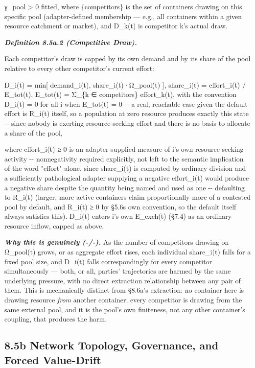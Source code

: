\documentclass[
]{article}
\begin{document}
γ\_pool \textgreater{} 0 fitted, where \{competitors\} is the set of
containers drawing on this specific pool (adapter-defined membership ---
e.g., all containers within a given resource catchment or market), and
D\_k(t) is competitor k's actual draw.

\emph{\textbf{Definition 8.5a.2 (Competitive Draw).}}

Each competitor's draw is capped by its own demand and by its share of
the pool relative to every other competitor's current effort:

D\_i(t) = min{[} demand\_i(t), share\_i(t)·Ω\_pool(t) {]}, share\_i(t) =
effort\_i(t) / E\_tot(t), E\_tot(t) = Σ\_\{k ∈ competitors\}
effort\_k(t), with the convention D\_i(t) = 0 for all i when E\_tot(t) =
0 -\/- a real, reachable case given the default effort is R\_i(t)
itself, so a population at zero resource produces exactly this state
-\/- since nobody is exerting resource-seeking effort and there is no
basis to allocate a share of the pool,

where effort\_i(t) ≥ 0 is an adapter-supplied measure of i's own
resource-seeking activity -\/- nonnegativity required explicitly, not
left to the semantic implication of the word "effort" alone, since
share\_i(t) is computed by ordinary division and a sufficiently
pathological adapter supplying a negative effort\_i(t) would produce a
negative share despite the quantity being named and used as one -\/-
defaulting to R\_i(t) (larger, more active containers claim
proportionally more of a contested pool by default, and R\_i(t) ≥ 0 by
§5.6\textquotesingle s own convention, so the default itself always
satisfies this). D\_i(t) enters i's own E\_exch(t) (§7.4) as an ordinary
resource inflow, capped as above.

\emph{\textbf{Why this is genuinely (-/-).}} As the number of
competitors drawing on Ω\_pool(t) grows, or as aggregate effort rises,
each individual share\_i(t) falls for a fixed pool size, and D\_i(t)
falls correspondingly for every competitor simultaneously --- both, or
all, parties' trajectories are harmed by the same underlying pressure,
with no direct extraction relationship between any pair of them. This is
mechanically distinct from §8.6a's extraction: no container here is
drawing resource \emph{from} another container; every competitor is
drawing from the same external pool, and it is the pool's own
finiteness, not any other container's coupling, that produces the harm.

\hypertarget{b-network-topology-governance-and-forced-value-drift}{%
\subsection{8.5b Network Topology, Governance, and Forced
Value-Drift}\label{b-network-topology-governance-and-forced-value-drift}}
\end{document}
